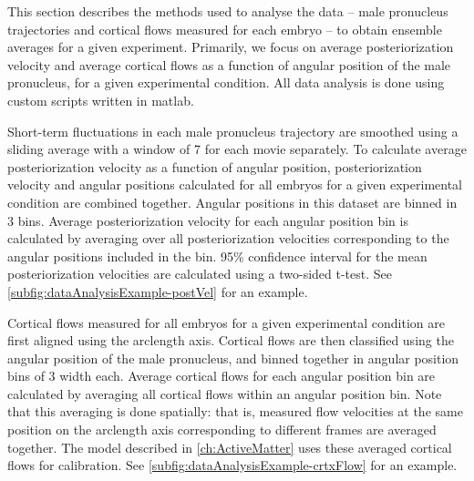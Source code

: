 This section describes the methods used to analyse the data -- male pronucleus trajectories and cortical flows measured for each embryo -- to obtain ensemble averages for a given experiment. Primarily, we focus on average posteriorization velocity and average cortical flows as a function of angular position of the male pronucleus, for a given experimental condition. All data analysis is done using custom scripts written in \ac{matlab}.

Short-term fluctuations in each male pronucleus trajectory are smoothed using a sliding average with a window of \SI{7}{\frames} for each movie separately. To calculate average posteriorization velocity as a function of angular position, posteriorization velocity and angular positions calculated for all embryos for a given experimental condition are combined together. Angular positions in this dataset are binned in \SI{3}{\unitAngle} bins. Average posteriorization velocity for each angular position bin is calculated by averaging over all posteriorization velocities corresponding to the angular positions included in the bin. \num{95}\% confidence interval for the mean posteriorization velocities are calculated using a two-sided t-test. See \autoref{subfig:dataAnalysisExample-postVel} for an example.

Cortical flows measured for all embryos for a given experimental condition are first aligned using the arclength axis. Cortical flows are then classified using the angular position of the male pronucleus, and binned together in angular position bins of \SI{3}{\unitAngle} width each. Average cortical flows for each angular position bin are calculated by averaging all cortical flows within an angular position bin. Note that this averaging is done spatially: that is, measured flow velocities at the same position on the arclength axis corresponding to different frames are averaged together. The model described in \autoref{ch:ActiveMatter} uses these averaged cortical flows for calibration. See \autoref{subfig:dataAnalysisExample-crtxFlow} for an example.

